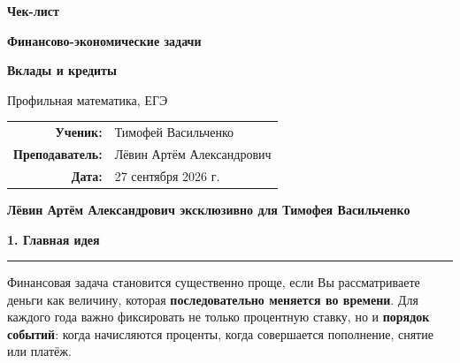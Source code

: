 \documentclass[a4paper,12pt]{article}
\newcommand{\sectiontitle}[1]{%
  \vspace{0.4em}
  {\Large\bfseries\color{darkaccent}#1}\par
  \vspace{0.15em}
  {\color{accent}\rule{\linewidth}{0.6pt}}\par
  \vspace{0.25em}
}
\begin{document}
\begin{titlepage}
\thispagestyle{empty}
\centering

\vspace*{18mm}

{\Large\color{accent}\bfseries Чек-лист\par}
\vspace{5mm}
{\Huge\bfseries\color{darkaccent}Финансово-экономические задачи\par}
\vspace{2mm}
{\LARGE\bfseries\color{textgray}Вклады и кредиты\par}

\vspace{14mm}

{\large\color{textgray}
Профильная математика, ЕГЭ\par}

\vspace{18mm}

\begin{tabular}{>{\bfseries}r l}
Ученик: & Тимофей Васильченко\\[2mm]
Преподаватель: & Лёвин Артём Александрович\\[2mm]
Дата: & 27 сентября 2026 г.
\end{tabular}

\vfill

{\large\color{darkaccent}\bfseries
Лёвин Артём Александрович эксклюзивно для Тимофея Васильченко
\par}

\vspace{10mm}


\vspace*{5mm}
\end{titlepage}

\sectiontitle{1. Главная идея}

Финансовая задача становится существенно проще, если Вы рассматриваете деньги как величину,
которая \textbf{последовательно меняется во времени}. Для каждого года важно фиксировать
не только процентную ставку, но и \textbf{порядок событий}: когда начисляются проценты,
когда совершается пополнение, снятие или платёж.
\end{document}
